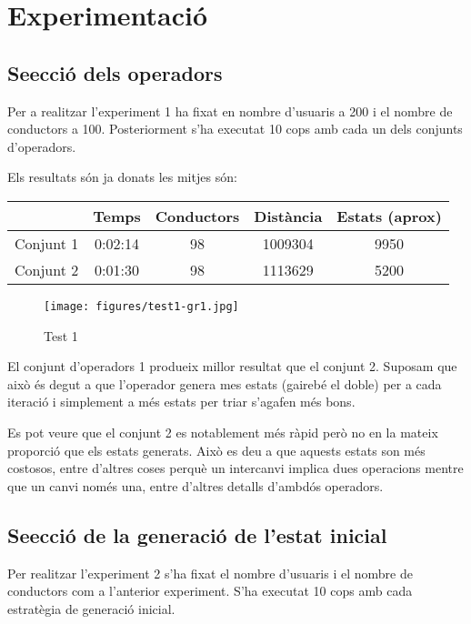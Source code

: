 \section{Experimentació}

\subsection{Se\lgem ecció dels operadors}
Per a realitzar l'experiment 1 ha fixat en nombre d'usuaris a 200 i el nombre de conductors a 100.
Posteriorment s'ha executat 10 cops amb cada un dels conjunts d'operadors.


Els resultats són ja donats les mitjes són:

\begin{center}
\begin{tabular}{l|cccc}
         & Temps & Conductors & Distància & Estats (aprox)\\
\hline
Conjunt 1 & 0:02:14 & 98 & 1009304 & 9950 \\
Conjunt 2 & 0:01:30 & 98 & 1113629 & 5200
\end{tabular}
\end{center}


\begin{figure}[H]
\begin{center}
 \texttt{[image: figures/test1-gr1.jpg]}
 \label{test1-gr1}
\caption{Test 1}
\end{center}
\end{figure}
                

El conjunt d'operadors 1 produeix millor resultat que el conjunt 2.
Suposam que això és degut a que l'operador genera mes estats (gairebé el doble) per a cada iteració i simplement a més estats per triar s'agafen més bons.

Es pot veure que el conjunt 2 es notablement més ràpid però no en la mateix proporció que els estats generats. Això es deu a que aquests estats
son més costosos, entre d'altres coses perquè un intercanvi implica dues operacions mentre que un canvi només una, entre d'altres detalls d'ambdós operadors.


\subsection{Se\lgem ecció de la generació de l'estat inicial}
Per realitzar l'experiment 2 s'ha fixat el nombre d'usuaris i el nombre de conductors com a l'anterior experiment.                                                                                   
S'ha executat 10 cops amb cada estratègia de generació inicial.
                                                                                                                                                                                                     
